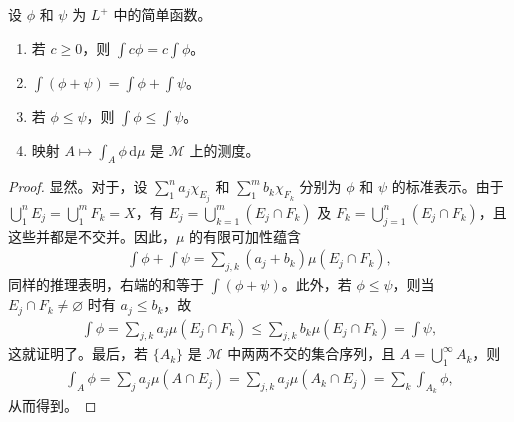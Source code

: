 \documentclass[../../main.tex]{subfiles}%
\begin{document}
\begin{proposition}\label{proposition:ch02-simple-integral-properties}
设 $\phi$ 和 $\psi$ 为 $L^+$ 中的简单函数。
\begin{enumerate}
\item\label{item:ch02-simple-integral-scaling} 若 $c\ge0$，则 $\int c\phi=c\int\phi$。
\item\label{item:ch02-simple-integral-additivity} $\int(\phi+\psi)=\int\phi+\int\psi$。
\item\label{item:ch02-simple-integral-monotonicity} 若 $\phi\le\psi$，则 $\int\phi\le\int\psi$。
\item\label{item:ch02-simple-integral-measure} 映射 $A\mapsto\int_A\phi\,\mathrm{d}\mu$ 是 $\mathscr{M}$ 上的测度。
\end{enumerate}
\end{proposition}
\begin{proof}
显然。对于，设 $\sum_1^n a_j\chi_{E_j}$ 和 $\sum_1^m b_k\chi_{F_k}$ 分别为 $\phi$ 和 $\psi$ 的标准表示。由于 $\bigcup_1^n E_j=\bigcup_1^m F_k=X$，有 $E_j=\bigcup_{k=1}^m(E_j\cap F_k)$ 及 $F_k=\bigcup_{j=1}^n(E_j\cap F_k)$，且这些并都是不交并。因此，$\mu$ 的有限可加性蕴含
\begin{align*}
\int\phi+\int\psi=\sum_{j,k}(a_j+b_k)\mu(E_j\cap F_k),
\end{align*}
同样的推理表明，右端的和等于 $\int(\phi+\psi)$。此外，若 $\phi\le\psi$，则当 $E_j\cap F_k\ne\varnothing$ 时有 $a_j\le b_k$，故
\begin{align*}
\int\phi=\sum_{j,k}a_j\mu(E_j\cap F_k)\le\sum_{j,k}b_k\mu(E_j\cap F_k)=\int\psi,
\end{align*}
这就证明了。最后，若 $\{A_k\}$ 是 $\mathscr{M}$ 中两两不交的集合序列，且 $A=\bigcup_1^\infty A_k$，则
\begin{align*}
\int_A\phi=\sum_j a_j\mu(A\cap E_j)=\sum_{j,k}a_j\mu(A_k\cap E_j)=\sum_k\int_{A_k}\phi,
\end{align*}
从而得到。
\end{proof}
\end{document}
